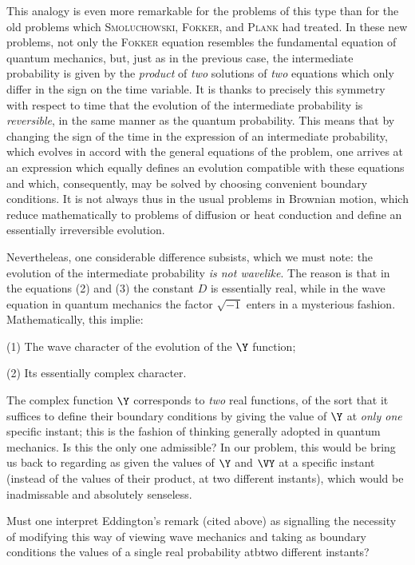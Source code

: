 \documentclass{article}
\newcommand{\const}[1]{#1}
\renewcommand{\it}[1]{\textit{#1}}
\renewcommand{\sc}[1]{\textsc{#1}}
\begin{document}
This analogy is even more remarkable for the problems of this type than for the old problems which \sc{Smoluchowski}, \sc{Fokker}, and \sc{Plank} had treated. In these new problems, not only the \sc{Fokker} equation resembles the fundamental equation of quantum mechanics, but, just as in the previous case, the intermediate probability is given by the \it{product} of \it{two} solutions of \it{two} equations which only differ in the sign on the time variable. It is thanks to precisely this symmetry with respect to time that the evolution of the intermediate probability is \it{reversible}, in the same manner as the quantum probability. This means that by changing the sign of the time in the expression of an intermediate probability, which evolves in accord with the general equations of the problem, one arrives at an expression which equally defines an evolution compatible with these equations and which, consequently, may be solved by choosing convenient boundary conditions. It is not always thus in the usual problems in Brownian motion, which reduce mathematically to problems of diffusion or heat conduction and define an essentially irreversible evolution.

Nevertheleas, one considerable difference subsists, which we must note: the evolution of the intermediate probability \it{is not wavelike}. The reason is that in the equations (2) and (3) the constant $\const{D}$ is essentially real, while in the wave equation in quantum mechanics the factor $\sqrt{-1}$ enters in a mysterious fashion. Mathematically, this implie:

(1) The wave character of the evolution of the $\Y$ function;

(2) Its essentially complex character.

The complex function $\Y$ corresponds to \it{two} real functions, of the sort that it suffices to define their boundary conditions by giving the value of $\Y$ at \it{only one} specific instant; this is the fashion of thinking generally adopted in quantum mechanics. Is this the only one admissible? In our problem, this would be bring us back to regarding as given the values of $\Y$ and $\VY$ at a specific instant (instead of the values of their product, at two different instants), which would be inadmissable and absolutely senseless.

Must one interpret Eddington's remark (cited above) as signalling the necessity of modifying this way of viewing wave mechanics and taking as boundary conditions the values of a single real probability atbtwo different instants?
\end{document}
